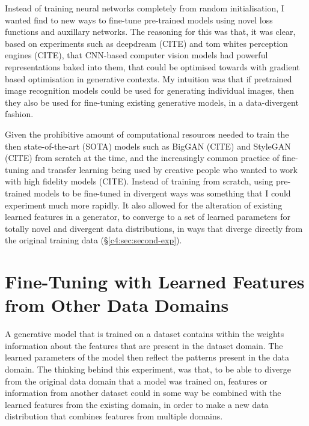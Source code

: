 Instead of training neural networks completely from random initialisation, I wanted find to new ways to fine-tune pre-trained models using novel loss functions and auxillary networks. 
The reasoning for this was that, it was clear, based on experiments such as deepdream (CITE) and tom whites perception engines (CITE), that CNN-based computer vision models had powerful representations baked into them, that could be optimised towards with gradient based optimisation in generative contexts.
My intuition was that if pretrained image recognition models could be used for generating individual images, then they also be used for fine-tuning existing generative models, in a data-divergent fashion.

Given the prohibitive amount of computational resources needed to train the then state-of-the-art (SOTA) models such as BigGAN (CITE) and StyleGAN (CITE) from scratch at the time, and the increasingly common practice of fine-tuning and transfer learning being used by creative people who wanted to work with high fidelity models (CITE). 
Instead of training from scratch, using pre-trained models to be fine-tuned in divergent ways was something that I could experiment much more rapidly. 
It also allowed for the alteration of existing learned features in a generator, to converge to a set of learned parameters for totally novel and divergent data distributions, in ways that diverge directly from the original training data (\S \ref{c4:sec:second-exp}). 

\section{Fine-Tuning with Learned Features from Other Data Domains}
\label{c4:sec:first-exp}

A generative model that is trained on a dataset contains within the weights information about the features that are present in the dataset domain. 
The learned parameters of the model then reflect the patterns present in the data domain. 
The thinking behind this experiment, was that, to be able to diverge from the original data domain that a model was trained on, features or information from another dataset could in some way be combined with the learned features from the existing domain, in order to make a new data distribution that combines features from multiple domains.

